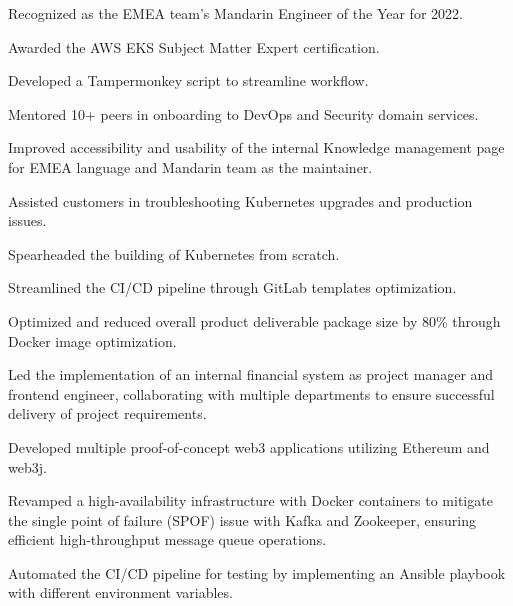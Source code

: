 \documentclass[]{deedy-resume-openfont}
\begin{document}
\begin{minipage}[t]{1\textwidth}
\null\hfill{}
\null\hfill{}
\begin{tightemize}
    \item Recognized as the EMEA team's Mandarin Engineer of the Year for 2022.
    \item Awarded the AWS EKS Subject Matter Expert certification.
    \item Developed a Tampermonkey script to streamline workflow.
    \item Mentored 10+ peers in onboarding to DevOps and Security domain services.
    \item Improved accessibility and usability of the internal Knowledge management page for EMEA language and Mandarin team as the maintainer.
    \item Assisted customers in troubleshooting Kubernetes upgrades and production issues.
\end{tightemize}
\sectionsep


\null\hfill{}
\begin{tightemize}
    \item Spearheaded the building of Kubernetes from scratch.
    \item Streamlined the CI/CD pipeline through GitLab templates optimization.
    \item Optimized and reduced overall product deliverable package size by 80\% through Docker image optimization.
    \item Led the implementation of an internal financial system as project manager and frontend engineer, collaborating with multiple departments to ensure successful delivery of project requirements.
\end{tightemize}
\sectionsep

\null\hfill{}
\begin{tightemize}
    \item Developed multiple proof-of-concept web3 applications utilizing Ethereum and web3j.
\end{tightemize}
\sectionsep

\null\hfill{}
\begin{tightemize}
    \item Revamped a high-availability infrastructure with Docker containers to mitigate the single point of failure (SPOF) issue with Kafka and Zookeeper, ensuring efficient high-throughput message queue operations.
    \item Automated the CI/CD pipeline for testing by implementing an Ansible playbook with different environment variables.
\end{tightemize}
\sectionsep


\end{minipage}
\end{document}
